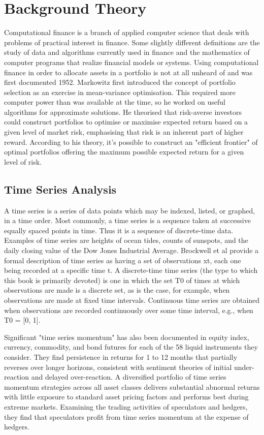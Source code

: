 \chapter{Background Theory}

Computational finance is a branch of applied computer science that deals with problems of practical interest in finance. Some slightly different definitions are the study of data and algorithms currently used in finance and the mathematics of computer programs that realize financial models or systems. Using computational finance in order to allocate assets in a portfolio is not at all unheard of and was first documented  1952.\cite{Markowitz:1952aa} Markowitz first introduced the concept of portfolio selection as an exercise in mean-variance optimisation. This required more computer power than was available at the time, so he worked on useful algorithms for approximate solutions. He theorised that risk-averse investors could construct portfolios to optimise or maximise expected return based on a given level of market risk, emphasising that risk is an inherent part of higher reward. According to his theory, it's possible to construct an "efficient frontier" of optimal portfolios offering the maximum possible expected return for a given level of risk. 

\section{Time Series Analysis}

A time series is a series of data points which may be indexed, listed, or graphed, in a time order. Most commonly, a time series is a sequence taken at successive equally spaced points in time. Thus it is a sequence of discrete-time data. Examples of time series are heights of ocean tides, counts of sunspots, and the daily closing value of the Dow Jones Industrial Average. Brockwell et al provide a formal description of time series as having a set of observations xt, each one being recorded at a specific time t. A discrete-time time series (the type to which this book is primarily devoted) is one in which the set T0 of times at which observations are made is a discrete set, as is the case, for example, when observations are made at fixed time intervals. Continuous time series are obtained when observations are recorded continuously over some time interval, e.g., when T0 = [0, 1].\cite{Peter-J.-Brockwell:2016aa}

Significant "time series momentum" has also been documented in equity index, currency, commodity, and bond futures for each of the 58 liquid instruments they consider.\cite{Moskowitz:2011aa} They find persistence in returns for 1 to 12 months that partially reverses over longer horizons, consistent with sentiment theories of initial under-reaction and delayed over-reaction. A diversified portfolio of time series momentum strategies across all asset classes delivers substantial abnormal returns with little exposure to standard asset pricing factors and performs best during extreme markets. Examining the trading activities of speculators and hedgers, they find that speculators profit from time series momentum at the expense of hedgers.

